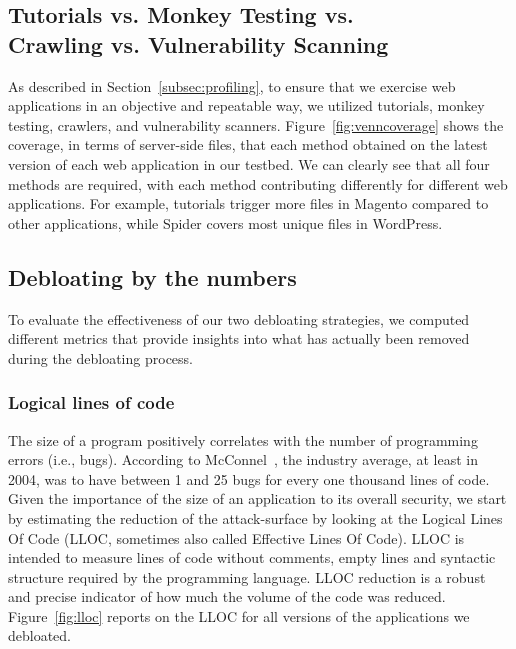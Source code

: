 \subsection{Tutorials vs. Monkey Testing vs. \\Crawling vs. Vulnerability Scanning}
As described in Section~\ref{subsec:profiling}, to ensure that we exercise web applications in an objective and repeatable way, we utilized tutorials, monkey testing, crawlers, and vulnerability scanners. Figure~\ref{fig:venncoverage} shows the coverage, in terms of server-side files, that each method obtained on the latest version of each web application in our testbed. We can clearly see that all four methods are required, with each method contributing differently for different web applications.
For example, tutorials trigger more files in Magento compared to other applications, while Spider covers most unique files in WordPress.


\subsection{Debloating by the numbers}
To evaluate the effectiveness of our two debloating strategies, we computed different metrics that provide
insights into what has actually been removed during the debloating process.


\subsubsection{Logical lines of code}
\label{subsubsec:lloc}
The size of a program positively correlates with the number of programming errors (i.e., bugs). According to McConnel~\cite{mcconnell2004code}, the industry average, at least in 2004, was to have between 1 and 25 bugs for every one thousand lines of code. Given the importance of the size of an application to its overall security, we start by estimating the reduction of the attack-surface by looking at the
Logical Lines Of Code (LLOC, sometimes also called Effective Lines Of
Code). LLOC is intended to measure lines of code without comments, empty
lines and syntactic structure required by the programming language. LLOC
reduction is a robust and precise indicator of how much the volume of
the code was reduced.
Figure~\ref{fig:lloc} reports on the LLOC for all versions of the applications
we debloated.

